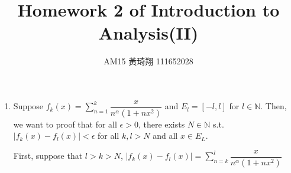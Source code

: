 \documentclass[12pt]{article}
\title{Homework 2 of Introduction to Analysis(II)}
\author{AM15 黃琦翔 111652028}
\begin{document}
\maketitle
\begin{enumerate}
    \item Suppose $f_k(x) = \displaystyle\sum_{n=1}^{k} \dfrac{x}{n^\alpha (1+nx^2)}$ and $E_l = [-l, l]$ for $l \in \mathbb{N}$.
    Then, we want to proof that 
    for all $\epsilon > 0$, there exists $N \in \mathbb{N}$ s.t. 
    $|f_k(x) - f_l(x)| < \epsilon$ for all $k, l > N$ and all $x \in E_L$.

    First, suppose that $l > k > N$, $|f_k(x) - f_l(x)| = \displaystyle\sum_{n=k}^l \dfrac{x}{n^\alpha (1+nx^2)}$

\end{enumerate}
\end{document}

